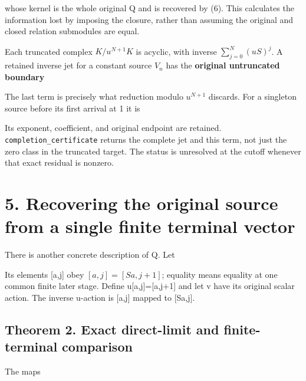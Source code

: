 
whose kernel is the whole original Q and is recovered by (6). This
calculates the information lost by imposing the closure, rather than
assuming the original and closed relation submodules are equal.

Each truncated complex \(K/u^{N+1}K\) is acyclic, with inverse
\(\sum_{j=0}^{N}(uS)^j\). A retained inverse jet for a constant source
\(V_n\) has the \textbf{original untruncated boundary}


The last term is precisely what reduction modulo \(u^{N+1}\) discards.
For a singleton source before its first arrival at 1 it is


Its exponent, coefficient, and original endpoint are retained.
\nolinkurl{completion_certificate} returns the complete jet and this
term, not just the zero class in the truncated target. The status is
unresolved at the cutoff whenever that exact residual is nonzero.

\section{5. Recovering the original source from a single finite terminal
vector}

There is another concrete description of Q. Let


Its elements {[}a,j{]} obey \([a,j]=[Sa,j+1]\); equality means equality
at one common finite later stage. Define u{[}a,j{]}={[}a,j+1{]} and let
v have its original scalar action. The inverse u-action is {[}a,j{]}
mapped to {[}Sa,j{]}.

\subsection{Theorem 2. Exact direct-limit and finite-terminal
comparison}

The maps


